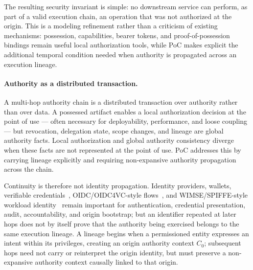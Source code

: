 \documentclass[11pt]{article}
\begin{document}
The resulting security invariant is simple: no downstream service can perform,
as part of a valid execution chain, an operation that was not authorized at the
origin. This is a modeling refinement rather than a criticism of existing
mechanisms: possession, capabilities, bearer tokens, and proof-of-possession
bindings remain useful local authorization tools, while PoC makes explicit the
additional temporal condition needed when authority is propagated across an
execution lineage.

\paragraph{Authority as a distributed transaction.}
A multi-hop authority chain is a distributed transaction over authority rather
than over data. A possessed artifact enables a local authorization decision at the
point of use --- often necessary for deployability, performance, and loose
coupling --- but revocation, delegation state, scope changes, and lineage are
global authority facts. Local authorization and global authority consistency
diverge when these facts are not represented at the point of use. PoC addresses
this by carrying lineage explicitly and requiring non-expansive authority
propagation across the chain.

Continuity is therefore not identity propagation. Identity providers, wallets,
verifiable credentials~\cite{vcdm2022}, OIDC/OIDC4VC-style
flows~\cite{openidconnect2014,openid4vc2024}, and WIMSE/SPIFFE-style workload
identity~\cite{wimse2024,spiffe2017} remain important
for authentication, credential presentation, audit, accountability, and origin
bootstrap; but an identifier repeated at later hops does not by itself prove that
the authority being exercised belongs to the same execution lineage. A lineage
begins when a permissioned entity expresses an intent within its privileges,
creating an origin authority context $C_0$; subsequent hops need not carry or
reinterpret the origin identity, but must preserve a non-expansive authority
context causally linked to that origin.
\end{document}
